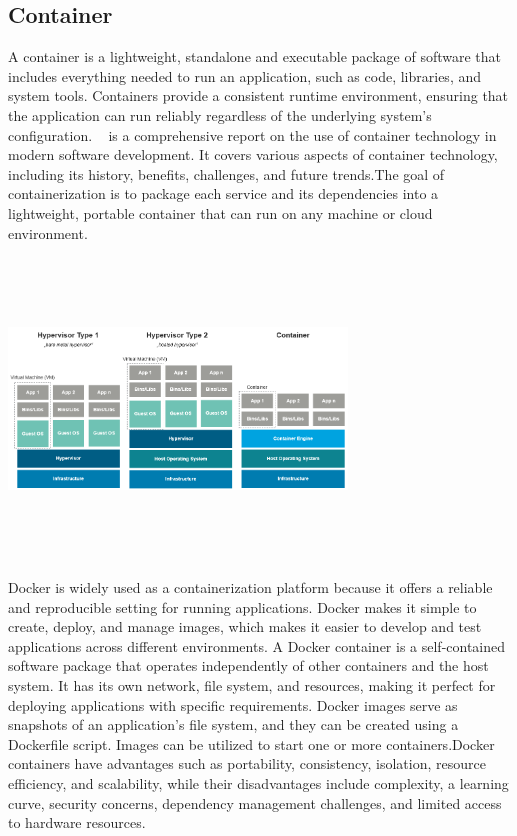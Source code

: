 \subsection{ Container}
A container is a lightweight, standalone and executable package of software that includes everything needed to run an application, such as code, libraries, and system tools. Containers provide a consistent runtime environment, ensuring that the application can run reliably regardless of the underlying system's configuration.
~\cite{siddiq2014comprehen} is a comprehensive report on the use of container technology in modern software development. It covers various aspects of container technology, including its history, benefits, challenges, and future trends.The goal of containerization is to package each service and its dependencies into a lightweight, portable container that can run on any machine or cloud environment. 

\includegraphics[width=9cm, height=8cm]{vitualmachine-vs-dockercontainer}

Docker is widely used as a containerization platform because it offers a reliable and reproducible setting for running applications. Docker makes it simple to create, deploy, and manage images, which makes it easier to develop and test applications across different environments. A Docker container is a self-contained software package that operates independently of other containers and the host system. It has its own network, file system, and resources, making it perfect for deploying applications with specific requirements. Docker images serve as snapshots of an application's file system, and they can be created using a Dockerfile script. Images can be utilized to start one or more containers.Docker containers have advantages such as portability, consistency, isolation, resource efficiency, and scalability, while their disadvantages include complexity, a learning curve, security concerns, dependency management challenges, and limited access to hardware resources.

